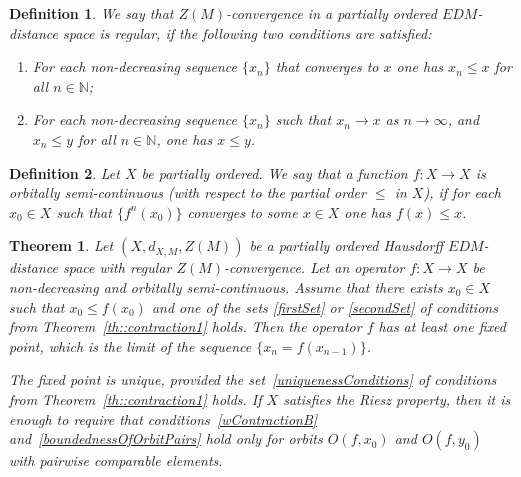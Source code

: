 \documentclass[12pt]{amsart}          %
\newtheorem{theorem}{Theorem}
\newtheorem{definition}{Definition}
\newcommand{\NN}{\mathbb N}
\begin{document}
\begin{definition}
We say that $Z(M)$-convergence in a partially ordered  $EDM$-distance space is regular, if the following two conditions are satisfied:
\begin{enumerate}
    \item For each non-decreasing sequence  $\{ x_n\}$ that converges to $x$ one has $x_n\leq x$ for all $n\in\NN$;
    \item  For each non-decreasing sequence $\{x_n\}$ such that $x_n\to x$ as $n\to\infty$, and $x_n \le y$ for all $n\in\NN$, one has $x\leq y$.
\end{enumerate}
\end{definition}
 \begin{definition}
Let $X$ be partially ordered.  We say that a function $f\colon X\to X$ is orbitally semi-continuous (with respect to the partial order $\le$ in $X$), if for each $x_0\in X$ such that $\{ f^n(x_0)\}$ converges to some $x\in X$ one has $f(x)\le x$. 
\end{definition}
 \begin{theorem}\label{th::monotoneMappingContraction}
Let $(X,d_{X,M}, Z(M))$ be a partially ordered Hausdorff $EDM$-distance space with regular $Z(M)$-convergence. Let an operator $f\colon X\to X$ be  non-decreasing and orbitally semi-continuous. Assume that there exists $x_0\in X$ such that $x_0\leq f(x_0)$ and one of the sets \eqref{firstSet} or \eqref{secondSet} of conditions from Theorem~\ref{th::contraction1} holds.
Then the operator $f$ has at least one fixed point, which is the limit of the sequence  $\{x_n = f(x_{n-1})\}$. 

The fixed point is unique, provided the set~\eqref{uniquenessConditions} of conditions from Theorem~\ref{th::contraction1} holds. If $X$ satisfies the Riesz property, then it is enough to require that conditions~\eqref{wContractionB} and~\eqref{boundednessOfOrbitPairs} hold only for orbits $O(f,x_0)$ and $O(f,y_0)$ with pairwise comparable elements.
\end{theorem}
\end{document}
